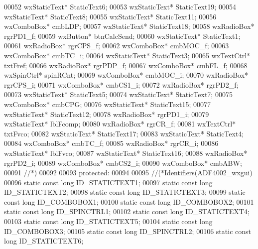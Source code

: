 \begin{DoxyCode}
00052     wxStaticText* StaticText6;
00053     wxStaticText* StaticText19;
00054     wxStaticText* StaticText8;
00055     wxStaticText* StaticText11;
00056     wxComboBox* cmbLDP;
00057     wxStaticText* StaticText18;
00058     wxRadioBox* rgrPD1_f;
00059     wxButton* btnCalcSend;
00060     wxStaticText* StaticText1;
00061     wxRadioBox* rgrCPS_f;
00062     wxComboBox* cmbMOC_f;
00063     wxComboBox* cmbTC_i;
00064     wxStaticText* StaticText3;
00065     wxTextCtrl* txtFref;
00066     wxRadioBox* rgrPDP_f;
00067     wxComboBox* cmbFL_f;
00068     wxSpinCtrl* spinRCnt;
00069     wxComboBox* cmbMOC_i;
00070     wxRadioBox* rgrCPS_i;
00071     wxComboBox* cmbCS1_i;
00072     wxRadioBox* rgrPD2_f;
00073     wxStaticText* StaticText5;
00074     wxStaticText* StaticText7;
00075     wxComboBox* cmbCPG;
00076     wxStaticText* StaticText15;
00077     wxStaticText* StaticText12;
00078     wxRadioBox* rgrPD1_i;
00079     wxStaticText* lblFcomp;
00080     wxRadioBox* rgrCR_f;
00081     wxTextCtrl* txtFvco;
00082     wxStaticText* StaticText17;
00083     wxStaticText* StaticText4;
00084     wxComboBox* cmbTC_f;
00085     wxRadioBox* rgrCR_i;
00086     wxStaticText* lblFvco;
00087     wxStaticText* StaticText16;
00088     wxRadioBox* rgrPD2_i;
00089     wxComboBox* cmbCS2_i;
00090     wxComboBox* cmbABW;
00091     \textcolor{comment}{//*)}
00092 
00093 \textcolor{keyword}{protected}:
00094 
00095     \textcolor{comment}{//(*Identifiers(ADF4002\_wxgui)}
00096     \textcolor{keyword}{static} \textcolor{keyword}{const} \textcolor{keywordtype}{long} ID_STATICTEXT1;
00097     \textcolor{keyword}{static} \textcolor{keyword}{const} \textcolor{keywordtype}{long} ID_STATICTEXT2;
00098     \textcolor{keyword}{static} \textcolor{keyword}{const} \textcolor{keywordtype}{long} ID_STATICTEXT3;
00099     \textcolor{keyword}{static} \textcolor{keyword}{const} \textcolor{keywordtype}{long} ID_COMBOBOX1;
00100     \textcolor{keyword}{static} \textcolor{keyword}{const} \textcolor{keywordtype}{long} ID_COMBOBOX2;
00101     \textcolor{keyword}{static} \textcolor{keyword}{const} \textcolor{keywordtype}{long} ID_SPINCTRL1;
00102     \textcolor{keyword}{static} \textcolor{keyword}{const} \textcolor{keywordtype}{long} ID_STATICTEXT4;
00103     \textcolor{keyword}{static} \textcolor{keyword}{const} \textcolor{keywordtype}{long} ID_STATICTEXT5;
00104     \textcolor{keyword}{static} \textcolor{keyword}{const} \textcolor{keywordtype}{long} ID_COMBOBOX3;
00105     \textcolor{keyword}{static} \textcolor{keyword}{const} \textcolor{keywordtype}{long} ID_SPINCTRL2;
00106     \textcolor{keyword}{static} \textcolor{keyword}{const} \textcolor{keywordtype}{long} ID_STATICTEXT6;

\end{DoxyCode}
